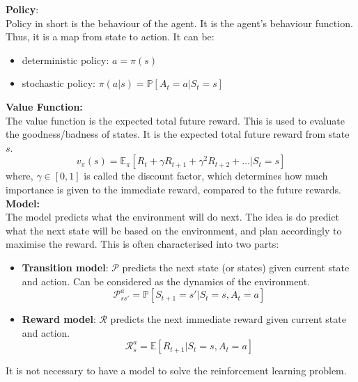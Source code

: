 \textbf{Policy}:\\
Policy in short is the behaviour of the agent. It is the agent's behaviour function. Thus, 
it is a map from state to action. It can be:
\begin{itemize}
    \item deterministic policy: \(a = \pi(s)\)
    \item stochastic policy: \(\pi(a|s) = \mathbb{P}[A_t = a | S_t = s]\)
\end{itemize}

\textbf{Value Function:}\\
The value function is the expected total future reward. This is used 
to evaluate the goodness/badness of states. It is the expected total future reward from state \(s\).
\[
    v_\pi(s) = \mathbb{E}_\pi [R_t + \gamma R_{t+1} + \gamma^2 R_{t+2} + \dots | S_t = s]  
\]
where, \(\gamma \in [0, 1]\) is called the discount factor, which determines how much importance
is given to the immediate reward, compared to the future rewards.\\

\textbf{Model:}\\
The model predicts what the environment will do next. The idea is do predict what the next state
will be based on the environment, and plan accordingly to maximise the reward. This is often 
characterised into two parts:
\begin{itemize}
    \item \textbf{Transition model}: \(\mathcal{P} \) predicts the next state (or states) given
     current state and action.
    Can be considered as the dynamics of the environment.
    \[
        \mathcal{P}_{ss'}^a = \mathbb{P}[S_{t+1} = s' | S_t = s, A_t = a]
    \]
    \item \textbf{Reward model}: \(\mathcal{R}\) predicts the next immediate reward given
     current state and action.
    \[
        \mathcal{R}_s^a = \mathbb{E}[R_{t+1} | S_t = s, A_t = a]
    \]
\end{itemize}

It is not necessary to have a model to solve the reinforcement learning problem. 

